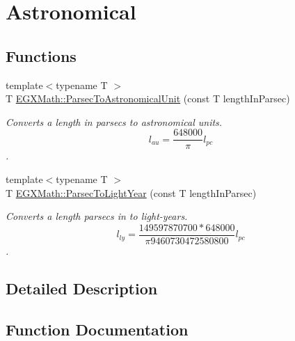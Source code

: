 \hypertarget{group___e_g_x_math-_conversions-_length_conversions-_astronomical-_parsec-_astronomical}{}\section{Astronomical}
\label{group___e_g_x_math-_conversions-_length_conversions-_astronomical-_parsec-_astronomical}
\subsection*{Functions}
\begin{DoxyCompactItemize}
\item 
{\footnotesize template$<$typename T $>$ }\\T \mbox{\hyperlink{group___e_g_x_math-_conversions-_length_conversions-_astronomical-_parsec-_astronomical_ga635dd871156c8bdd5e27198ba323380c}{E\+G\+X\+Math\+::\+Parsec\+To\+Astronomical\+Unit}} (const T length\+In\+Parsec)
\begin{DoxyCompactList}\small\item\em Converts a length in parsecs to astronomical units. \[ l_{au}= \frac{648000}{\pi} l_{pc} \]. \end{DoxyCompactList}\item 
{\footnotesize template$<$typename T $>$ }\\T \mbox{\hyperlink{group___e_g_x_math-_conversions-_length_conversions-_astronomical-_parsec-_astronomical_gaf6681b9c24d89c83c48bf6dabb9a433d}{E\+G\+X\+Math\+::\+Parsec\+To\+Light\+Year}} (const T length\+In\+Parsec)
\begin{DoxyCompactList}\small\item\em Converts a length parsecs in to light-\/years. \[ l_{ly}= \frac{149597870700 * 648000}{\pi 9460730472580800} l_{pc} \]. \end{DoxyCompactList}\end{DoxyCompactItemize}


\subsection{Detailed Description}


\subsection{Function Documentation}
\mbox{\label{group___e_g_x_math-_conversions-_length_conversions-_astronomical-_parsec-_astronomical_ga635dd871156c8bdd5e27198ba323380c}} 
